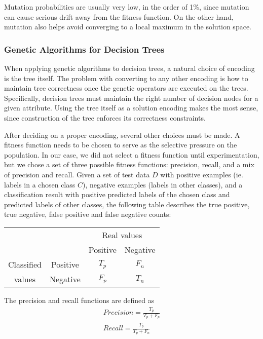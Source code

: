 \documentclass[12pt, letterpaper]{article}
\begin{document}
Mutation probabilities are usually very low, in the order of 1\%, since mutation can cause serious drift away from the fitness function. On the other hand, mutation also helps avoid converging to a local maximum in the solution space.

\subsubsection*{Genetic Algorithms for Decision Trees}

When applying genetic algorithms to decision trees, a natural choice of encoding is the tree itself. The problem with converting to any other encoding is how to maintain tree correctness once the genetic operators are executed on the trees. Specifically, decision trees must maintain the right number of decision nodes for a given attribute. Using the tree itself as a solution encoding makes the most sense, since construction of the tree enforces its correctness constraints.

After deciding on a proper encoding, several other choices must be made. A fitness function needs to be chosen to serve as the selective pressure on the population. In our case, we did not select a fitness function until experimentation, but we chose a set of three possible fitness functions: precision, recall, and a mix of precision and recall. Given a set of test data $D$ with positive examples (ie. labels in a chosen class $C$), negative examples (labels in other classes), and a classification result with positive predicted labels of the chosen class and predicted labels of other classes, the following table describes the true positive, true negative, false positive and false negative counts:

\begin{center}\begin{tabular}{|c|c|c|c|}
    \hline
    & & \multicolumn{2}{|c|}{Real values} \\
    \cline{3-4}
           & & Positive & Negative \\ \hline
    Classified & Positive& $T_p$ & $F_n$ \\ \cline{2-4}
    values & Negative& $F_p$ & $T_n$ \\ \hline
\end{tabular}\end{center}

The precision and recall functions are defined as
\begin{eqnarray}
    Precision = \frac{T_p}{T_p + F_p}\\
    Recall = \frac{T_p}{T_p + F_n}
\end{eqnarray}
\end{document}

